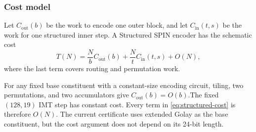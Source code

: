 \subsubsection{Cost model}

Let $C_{\mathrm{out}}(b)$ be the work to encode one outer block, and let
$C_{\mathrm{in}}(t,s)$ be the work for one structured inner step. A
Structured SPIN encoder has the schematic cost
\begin{equation}
  T(N)
  =
  \frac{N}{b}C_{\mathrm{out}}(b)
  +
  \frac{N}{t}C_{\mathrm{in}}(t,s)
  +O(N),
  \label{eq:structured-cost}
\end{equation}
where the last term covers routing and permutation work.

For any fixed base constituent with a constant-size encoding circuit, tiling,
two permutations, and two accumulators give
$C_{\mathrm{out}}(b)=O(b)$.\linebreak The fixed $(128,19)$ IMT step has constant cost.
Every term in \eqref{eq:structured-cost} is therefore $O(N)$. The current
certificate uses extended Golay as the base constituent, but the cost argument
does not depend on its 24-bit length.
